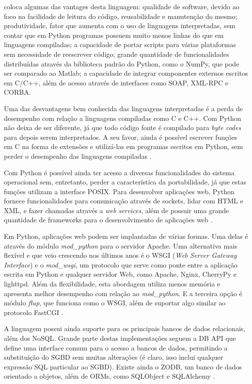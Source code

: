 \documentclass[diss]{template/setrem}
\begin{document}
\citet{Lutz2010} coloca algumas das vantages desta linguagem: qualidade de software, devido ao foco na facilidade de leitura do código, reusabilidade e manutenção do mesmo; produtividade, fator que aumenta com o uso de linguagens interpretadas, sem contar que em Python programas possuem muito menos linhas do que em linguagens compiladas; a capacidade de portar scripts para várias plataformas sem necessidade de reescrever código; grande quantidade de funcionalidades distribuídas através da biblioteca padrão do Python, como o NumPy, que pode ser comparado ao Matlab; a capacidade de integrar componentes externos escritos em C/C++, além de acesso através de interfaces como SOAP, XML-RPC e CORBA.

Uma das desvantagens bem conhecida das linguagens interpretadas é a perda de desempenho com relação a linguagens compiladas como C e C++. Com Python não deixa de ser diferente, já que todo código fonte é compilado para \emph{byte codes} para depois serem interpretados. A seu favor, ainda é possível escrever funções em C na forma de extensões e utilizá-las em programas escritos em Python, sem perder o desempenho das linguagens compiladas \citep{Lutz2010}.

Com Python é possível ainda ter acesso a diversas funcionalidades do sistema operacional sem, entretanto, perder a característica da portabilidade, já que estas funções utilizam a interface POSIX. Para desenvolver aplicações web, Python fornece funcionalidades para comunicação através de sockets, lidar com HTML e XML, e fazer chamadas através a \emph{web services}, além de possuir uma grande quantidade de frameworks para o desenvolvimento de aplicações web \citep{Lutz2010}.

Em Python, aplicações web podem ser implantadas de várias formas. Uma delas é através do módulo \emph{mod\_python} para o servidor Apache. Uma alternativa mais flexível e que veio crescendo nos últimos anos é o WSGI (\emph{Web Server Gateway Interface}) e o \emph{mod\_wsgi}, um protocolo que serve como ponte entre a aplicação escrita em Python e qualquer servidor Web, como Apache, Nginx, CherryPy e lighttpd. Além da flexibilidade, esta abordagem utiliza menos memória e apresenta melhor desempenho com relação ao \emph{mod\_python}. E a terceira opção é módulo \emph{flup}, que funciona como o WSGI, além de suportar algo similar ao protocolo FastCGI \citep{Forcier2009}.

A linguagem possui ainda suporte para os principais bancos de dados relacionais, além dos NoSQL. Grande parte destas implementações seguem a DB API que define uma interface comum para o acesso a bancos de dados, permitindo a substituição do SGBD sem muitas alterações (é claro, isso inclui qualquer expressão SQL particular ao SGBD). Existe ainda o ZODB, um banco de dados orientado a objetos, além de ORMs, como SQLObject e SQLAlchemy \citep{Lutz2010}.
\end{document}
